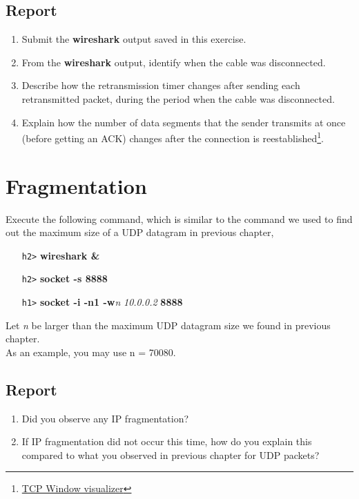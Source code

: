\documentclass[10pt,a4paper]{article}
\numberwithin{equation}{section}
\numberwithin{figure}{section}
\numberwithin{table}{section}
\begin{document}
    \subsection*{Report}
    \begin{enumerate}
        \item Submit the \textbf{wireshark} output saved in this exercise.
        \item From the \textbf{wireshark} output, identify when the cable was disconnected.
        \item Describe how the retransmission timer changes after sending each retransmitted packet, during the period when the cable was disconnected.
        \item Explain how the number of data segments that the sender transmits at once (before getting an ACK) changes after the connection is reestablished\footnote{\href{http://www.ccs-labs.org/teaching/rn/animations/gbn_sr/}{TCP Window visualizer}}.
    \end{enumerate}
    
\section*{Fragmentation}
    Execute the following command, which is similar to the command we used to find out the maximum size of a UDP datagram in previous chapter, \\
    \begin{itemize}
        \item [\texttt{h2>}] \textbf{wireshark \&}
        \item [\texttt{h2>}] \textbf{socket -s 8888} 
        \item [\texttt{h1>}] \textbf{socket -i -n1 -w}\textit{n} \textit{10.0.0.2} \textbf{8888} 
    \end{itemize}
    Let \textit{n} be larger than the maximum UDP datagram size we found in previous chapter. \\
    As an example, you may use n = 70080.
    \subsection*{Report}
    \begin{enumerate}
        \item Did you observe any IP fragmentation?
        \item If IP fragmentation did not occur this time, how do you explain this compared to what you observed in previous chapter for UDP packets?
    \end{enumerate}
    
\end{document}
